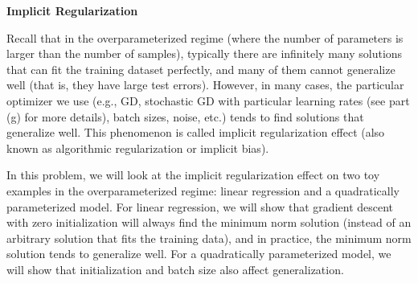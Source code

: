 \item {} {\bf Implicit Regularization}

Recall that in the overparameterized regime (where the number of parameters is larger than the number of samples), typically there are infinitely many solutions that can fit the training dataset perfectly, and many of them cannot generalize well (that is, they have large test errors). However, in many cases, the particular optimizer we use (e.g., GD, stochastic GD with particular learning rates (see part (g) for more details), batch sizes, noise, etc.) tends to find solutions that generalize well. This phenomenon is called implicit regularization effect (also known as algorithmic regularization or implicit bias). 

In this problem, we will look at the implicit regularization effect on two toy examples in the overparameterized regime: linear regression and a quadratically parameterized model. For linear regression, we will show that gradient descent with zero initialization will always find the minimum norm solution (instead of an arbitrary solution that fits the training data), and in practice, the minimum norm solution tends to generalize well. For a quadratically parameterized model, we will show that initialization and batch size also affect generalization.

\begin{enumerate}
    
    	\ifnum{} {
	
    	}\fi
    
    
    
    \ifnum{} {
    	
    	}\fi
    
    
	\ifnum{} {
		
		}\fi
	
	
	\ifnum{} {
		
	}\fi

	
	\ifnum{} {
		
	}\fi

	
	\ifnum{} {
		
	}\fi

	
	\ifnum{} {
		
	}\fi
\end{enumerate}
